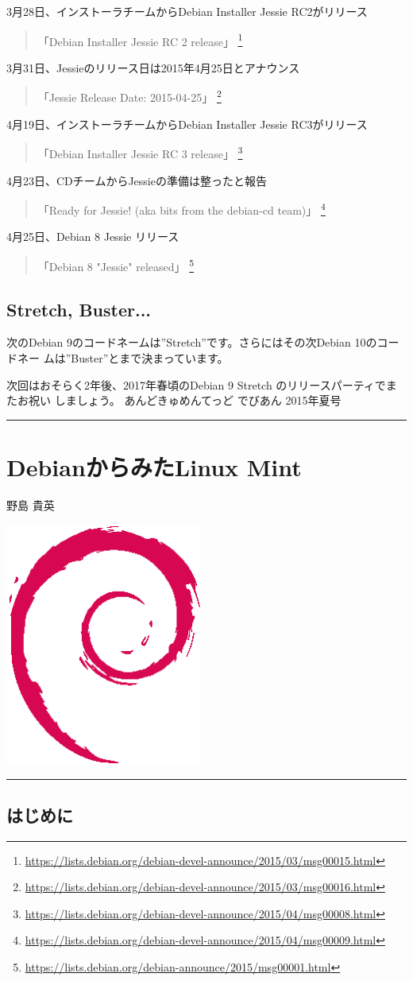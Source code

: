 \documentclass[mingoth,a4paper]{jsarticle}
\renewcommand{\dancersection}[2]{%
\newpage
あんどきゅめんてっど でびあん 2015年夏号
%
\vspace{0.1mm}\\
{\color{dancerdarkblue}\rule{\hsize}{2mm}}

%
%
\begin{minipage}[t]{0.6\hsize}
\color{dancerdarkblue}
\vspace{1cm}
\section{#1}
\hfill{}#2\\
\end{minipage}
\begin{minipage}[t]{0.4\hsize}
\vspace{-2cm}
\hfill{}\includegraphics[height=8cm]{image200502/openlogo-nd.eps}\\
\vspace{-5cm}
\end{minipage}
%
{\color{dancerlightblue}\rule{0.66\hsize}{2mm}}
%
\vspace{2cm}
}
\begin{document}
3月28日、インストーラチームからDebian Installer Jessie RC2がリリース
\begin{quote}
  「Debian Installer Jessie RC 2 release」
  \footnote{\url{https://lists.debian.org/debian-devel-announce/2015/03/msg00015.html}}
\end{quote}

3月31日、Jessieのリリース日は2015年4月25日とアナウンス
\begin{quote}
  「Jessie Release Date: 2015-04-25」
  \footnote{\url{https://lists.debian.org/debian-devel-announce/2015/03/msg00016.html}}
\end{quote}

4月19日、インストーラチームからDebian Installer Jessie RC3がリリース
\begin{quote}
  「Debian Installer Jessie RC 3 release」
  \footnote{\url{https://lists.debian.org/debian-devel-announce/2015/04/msg00008.html}}
\end{quote}

4月23日、CDチームからJessieの準備は整ったと報告
\begin{quote}
  「Ready for Jessie! (aka bits from the debian-cd team)」
  \footnote{\url{https://lists.debian.org/debian-devel-announce/2015/04/msg00009.html}}
\end{quote}

4月25日、Debian 8 Jessie リリース
\begin{quote}
  「Debian 8 "Jessie" released」
  \footnote{\url{https://lists.debian.org/debian-announce/2015/msg00001.html}}
\end{quote}

\subsection{Stretch, Buster...}

次のDebian 9のコードネームは''Stretch''です。さらにはその次Debian 10のコードネー
ムは''Buster''とまで決まっています。

次回はおそらく2年後、2017年春頃のDebian 9 Stretch のリリースパーティでまたお祝い
しましょう。
\dancersection{DebianからみたLinux Mint}{野島 貴英}

\subsection{はじめに}
\end{document}
